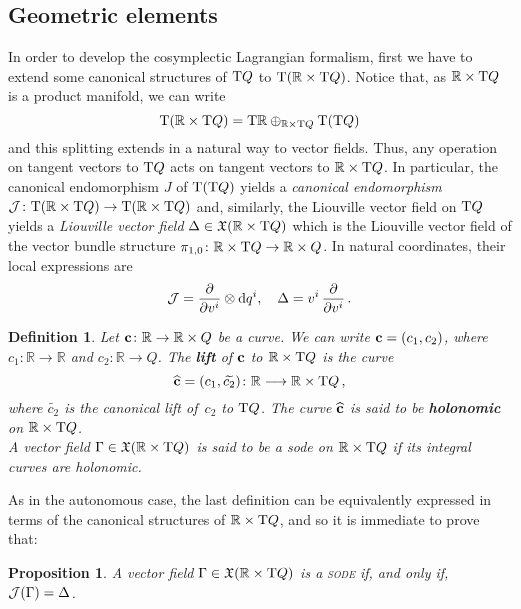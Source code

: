 \documentclass[12pt]{report}
\newtheorem{prop}[teor]{Proposition}
\newtheorem{definition}[teor]{Definition}
\def\vf{\mathfrak X}
\def\d{{\rm d}}
\def\Real{\mathbb{R}}
\def\Tan{{\rm T}}
\begin{document}
\subsection{Geometric elements}
\label{geomRxTQ}


In order to develop the cosymplectic Lagrangian formalism, first
we have to extend some canonical structures of
$\Tan Q$ to $\Tan(\Real\times\Tan Q)$.
Notice that, as $\Real\times\Tan Q$ is a product manifold, we can write
$$
\Tan(\Real\times\Tan Q) =\Tan\Real\oplus_{\Real\times\Tan Q}
\Tan(\Tan Q)
$$
and this splitting extends in a natural way to vector fields.
Thus, any operation on tangent vectors to $\Tan Q$
acts on tangent vectors to $\Real\times\Tan Q$.
In particular, the canonical endomorphism $J$
of $\Tan(\Tan Q)$ yields a \textsl{canonical endomorphism}
${\cal J} \colon \Tan (\Real\times\Tan Q) \to \Tan (\Real\times\Tan Q)$ and,
similarly, the Liouville vector field on $\Tan Q$
yields a \textsl{Liouville vector field}
$\Delta \in \vf(\Real\times\Tan Q)$ which is the Liouville vector field 
of the vector bundle structure $\pi_{1,0}\colon\Real\times\Tan Q\to\Real\times Q$.
In natural coordinates, their local expressions are
$$
{\cal J} =
\frac{\partial}{\partial v^i} \otimes \d q^i
,\quad
\Delta = 
v^i\, \frac{\partial}{\partial v^i}
\,.
$$

\begin{definition}
\label{de652}
Let  ${\bf c} \colon\Real \rightarrow \Real\times Q$ be a curve.
We can write ${\bf c} = (c_1,c_2)$, where
$c_1 \colon\Real \rightarrow \Real$ and $c _2\colon\Real \rightarrow Q$.
The \textbf{lift} of ${\bf c}$ 
to $\Real\times\Tan Q$ is the curve
$$
\widehat{\bf c}=(c_1,\widetilde{c_2})\colon\Real \longrightarrow \Real\times\Tan Q  \,,
$$
where $\widetilde{c_2}$ is the canonical lift of~$c_2$ to $\Tan Q$.
The curve $\widehat{\bf c}$ is said to be \textbf{holonomic} on $\Real\times\Tan Q$.
\\
A vector field  $\Gamma \in \vf(\Real\times\Tan Q)$ 
is said to be a  {\sc sode} on $\Real\times\Tan Q$ if its integral curves are holonomic. 
\end{definition}

As in the autonomous case, the last definition can be 
equivalently expressed in terms of the canonical structures of
$\Real\times\Tan Q$, and so it is immediate to prove that:

\begin{prop}
A vector field $\Gamma \in\vf(\Real\times\Tan Q)$ 
is a \textsc{sode} if, and only if,
${\cal J}(\Gamma) = \Delta$.
\end{prop}
\end{document}
